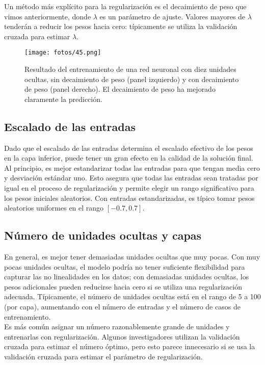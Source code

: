 Un método más explícito para la regularización es el decaimiento de peso que vimos anteriormente, donde $\lambda$ es un parámetro de ajuste. Valores mayores de $\lambda$ tenderán a reducir los pesos hacia cero: típicamente se utiliza la validación cruzada para estimar $\lambda$. 

\begin{figure}[h]
\centering
\texttt{[image: fotos/45.png]}
\caption{Resultado del entrenamiento de una red neuronal con diez unidades ocultas, sin decaimiento de peso (panel izquierdo) y con decaimiento de peso (panel derecho). El decaimiento de peso ha mejorado claramente la predicción.}
\label{fig:7.6}
\end{figure}

\subsection{Escalado de las entradas}

Dado que el escalado de las entradas determina el escalado efectivo de los pesos en la capa inferior, puede tener un gran efecto en la calidad de la solución final. Al principio, es mejor estandarizar todas las entradas para que tengan media cero y desviación estándar uno. Esto asegura que todas las entradas sean tratadas por igual en el proceso de regularización y permite elegir un rango significativo para los pesos iniciales aleatorios. Con entradas estandarizadas, es típico tomar pesos aleatorios uniformes en el rango $[-0.7, 0.7]$.

\subsection{Número de unidades ocultas y capas}

En general, es mejor tener demasiadas unidades ocultas que muy pocas. Con muy pocas unidades ocultas, el modelo podría no tener suficiente flexibilidad para capturar las no linealidades en los datos; con demasiadas unidades ocultas, los pesos adicionales pueden reducirse hacia cero si se utiliza una regularización adecuada. Típicamente, el número de unidades ocultas está en el rango de 5 a 100 (por capa), aumentando con el número de entradas y el número de casos de entrenamiento. \\

Es más común asignar un número razonablemente grande de unidades y entrenarlas con regularización. Algunos investigadores utilizan la validación cruzada para estimar el número óptimo, pero esto parece innecesario si se usa la validación cruzada para estimar el parámetro de regularización. \\

